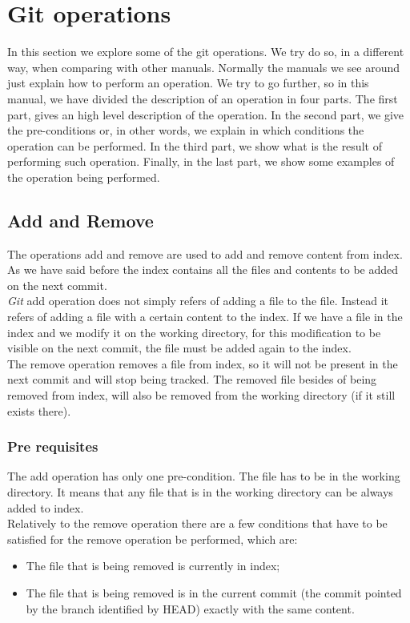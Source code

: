 
\chapter{Git operations}
In this section we explore some of the git operations. We try do
so, in a different way, when comparing with other manuals. Normally the
manuals we see around just explain how to perform an operation. We
try to go further, so in this manual, we have divided the description of an operation in four parts.
The first part, gives an high level description of the
operation. In the second part, we give the pre-conditions or, in other
words, we explain in which conditions the operation can be performed.
In the third part, we show what is the result of performing such operation.
Finally, in the last part, we show some examples of the operation being performed. 

\section{Add and Remove}
The operations add and remove are used to add and remove content from
index. As we have said before the index contains all the files and
contents to be added on the next commit.\\

\emph{Git} add operation does not simply refers of adding a file to the file. 
Instead it refers of adding a file with a certain content to the index. If we have a file in the index and we
modify it on the working directory, for this modification to be visible
on the next commit, the file must be added again to the index.\\

The remove operation removes a file from index, so it will not be
present in the next commit and will stop being tracked. The removed
file besides of being removed from index, will also be removed from the 
working directory (if it still exists there).

\subsection{Pre requisites}
The add operation has only one pre-condition. The file has to be in
the working directory. It means that any file that is
in the working directory can be always added to index.\\

Relatively to the remove operation there are a few conditions that
have to be satisfied for the remove operation be performed, which are: 
\begin{itemize}
\item The file that is being removed is currently in index;
\item The file that is being removed is in the current commit 
(the commit pointed by the branch identified by HEAD) exactly with the same
content.
\end{itemize}

